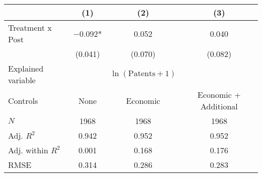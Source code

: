 
\begin{tabular}[t]{lccc}
\toprule
  & (1) & (2) & (3)\\
\midrule
Treatment x Post & \num{-0.092}* & \num{0.052} & \num{0.040}\\
 & (\num{0.041}) & (\num{0.070}) & (\num{0.082})\\
\midrule
Explained variable &  & $\ln(\text{Patents}+1)$ & \\
Controls & None & Economic & Economic + Additional\\
$N$ & \num{1968} & \num{1968} & \num{1968}\\
Adj. $R^2$ & \num{0.942} & \num{0.952} & \num{0.952}\\
Adj. within $R^2$ & \num{0.001} & \num{0.168} & \num{0.176}\\
RMSE & \num{0.314} & \num{0.286} & \num{0.283}\\
\bottomrule
\end{tabular}
